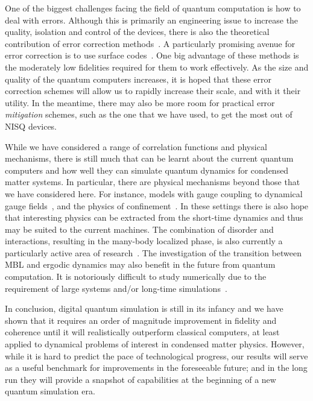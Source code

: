 \documentclass[twocolumn,showpacs,preprintnumbers,nofootinbib,amsmath,aps,pra,longbibliography,amssymb,superscriptaddress]{revtex4-1}
\begin{document}
One of the biggest challenges facing the field of quantum computation is how to deal with errors. Although this is primarily an engineering issue to increase the quality, isolation and control of the devices, there is also the theoretical contribution of error correction methods~\cite{Nielsen2010,PreskillChapt7,Devitt2013}. A particularly promising avenue for error correction is to use surface codes~\cite{Fowler2012,Bravyi2017}. One big advantage of these methods is the moderately low fidelities required for them to work effectively. As the size and quality of the quantum computers increases, it is hoped that these error correction schemes will allow us to rapidly increase their scale, and with it their utility. In the meantime, there may also be more room for practical error \emph{mitigation} schemes, such as the one that we have used, to get the most out of NISQ devices.


While we have considered a range of correlation functions and physical mechanisms, there is still much that can be learnt about the current quantum computers and how well they can simulate quantum dynamics for condensed matter systems. In particular, there are physical mechanisms beyond those that we have considered here. For instance, models with gauge coupling to dynamical gauge fields~\cite{Martinez2016,Klco2018,Wiese2013,Zohar2016}, and the physics of confinement~\cite{Kormos2016,Liu2019}. In these settings there is also hope that interesting physics can be extracted from the short-time dynamics and thus may be suited to the current machines. The combination of disorder and interactions, resulting in the many-body localized phase, is also currently a particularly active area of research~\cite{Abanin2017,Nandkishore2015,Choi2016,Schreiber2015}.
The investigation of the transition between MBL and ergodic dynamics may also benefit in the future from quantum computation. It is notoriously difficult to study numerically due to the requirement of large systems and/or long-time simulations~\cite{Pal2010,Luitz2014,Herviou2018}.


In conclusion, digital quantum simulation is still in its infancy and we have shown that it requires an order of magnitude improvement in fidelity and coherence until it will realistically outperform classical computers, at least applied to dynamical problems of interest in condensed matter physics. However, while it is hard to predict the pace of technological progress, our results will serve as a useful benchmark for improvements in the foreseeable future; and in the long run they will provide a snapshot of capabilities at the beginning of a new quantum simulation era.
\end{document}
